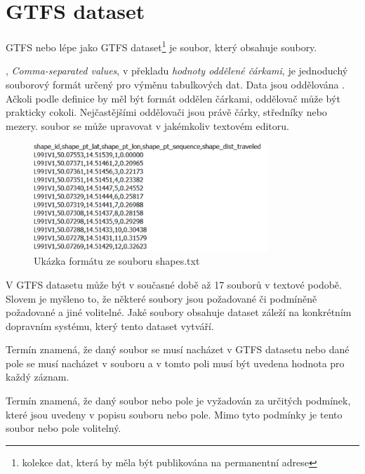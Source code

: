 
\section{GTFS dataset}
GTFS  nebo lépe jako GTFS dataset\footnote{kolekce dat, která by měla být publikována na permanentní  adrese}
je  soubor, který obsahuje  soubory.

, \textit{Comma-separated values}, v překladu \textit{hodnoty oddělené čárkami}, je jednodu\-chý 
souborový formát určený pro výměnu tabulkových dat. Data jsou oddělována .
Ačkoli podle definice by měl být formát oddělen čárkami, oddělovač může být prakticky cokoli. 
Nejčastějšími oddělovači jsou právě čárky, středníky nebo mezery.  soubor se 
může upravovat v jakémkoliv textovém editoru.

\begin{figure}[H] \centering
    \includegraphics[width=250pt]{./pictures/ukazka-csv.PNG}
    \caption[Ukázka  formátu ze souboru shapes.txt]{Ukázka  formátu ze souboru shapes.txt}
	\label{fig:ukazka-csv}              
\end{figure}

V GTFS datasetu může být v současné době až 17  souborů v textové podobě. Slovem  je myšleno to,
že některé  soubory jsou požadované či podmíněně požadované a jiné volitelné.
Jaké  soubory obsahuje dataset záleží na konkrétním dopravním systému, který
tento dataset vytváří.

Termín  znamená, že daný  soubor se musí nacházet v GTFS datasetu nebo dané pole
se musí nacházet v  souboru a v tomto poli musí být uvedena hodnota pro každý záznam. 

Termín  znamená, že daný  soubor nebo pole je vyžadován za určitých podmínek, 
které jsou uvedeny v popisu souboru nebo pole. Mimo tyto podmínky je tento soubor nebo pole volitelný.

